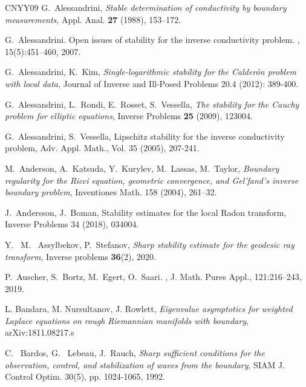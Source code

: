 \documentclass[12pt,twoside]{amsart}
\numberwithin{equation}{section}
\begin{document}

\begin{thebibliography}{CNYY09}
G.\ Alessandrini, \textit{{Stable determination of conductivity by boundary measurements}}, Appl. Anal. {\bf 27} (1988), 153--172.


G.\ Alessandrini.
\newblock Open issues of stability for the inverse conductivity problem.
, 15(5):451--460, 2007.

G.\ Alessandrini, K.\ Kim, \textit{{Single-logarithmic stability for the Calder{\'o}n problem with local data}}, Journal of Inverse and Ill-Posed Problems 20.4 (2012): 389-400.

 G.\ Alessandrini, L.\ Rondi, E.\ Rosset, S.\ Vessella, \textit{{The stability for the Cauchy problem for elliptic equations}}, Inverse Problems {\bf 25} (2009), 123004.

G.\ Alessandrini, S.\ Vessella, Lipschitz stability for the inverse conductivity problem, Adv. Appl. Math., Vol. 35 (2005), 207-241.


M.\ Anderson, A.\ Katsuda, Y.\ Kurylev, M.\ Lassas, M.\ Taylor, \textit{{Boundary regularity for the Ricci equation, geometric convergence, and Gel'fand's inverse boundary problem}}, Inventiones Math. 158 (2004), 261--32.

J.\ Andersson, J.\ Boman, Stability estimates for the local Radon transform, Inverse Problems 34 (2018), 034004.

Y. \ M. \ Assylbekov, P.\ Stefanov, \textit{{Sharp stability estimate for the geodesic ray transform}}, Inverse problems {\bf 36}(2), 2020.

P.\ Auscher, S.\ Bortz, M.\ Egert, O.\ Saari.
, 
\newblock J. Math. Pures Appl.,
  121:216--243, 2019.
  
  

L. Bandara, M. Nursultanov, J. Rowlett, \textit{{Eigenvalue asymptotics for weighted Laplace equations on rough Riemannian manifolds with boundary}}, arXiv:1811.08217.s  
  
  
C. \ Bardos, G. \ Lebeau, J.\ Rauch,
\textit{{Sharp sufficient conditions for the observation, control, and stabilization of waves from the boundary}}, SIAM J. Control Optim. 30(5), pp. 1024-1065, 1992.  
  

\end{thebibliography}
\end{document}
